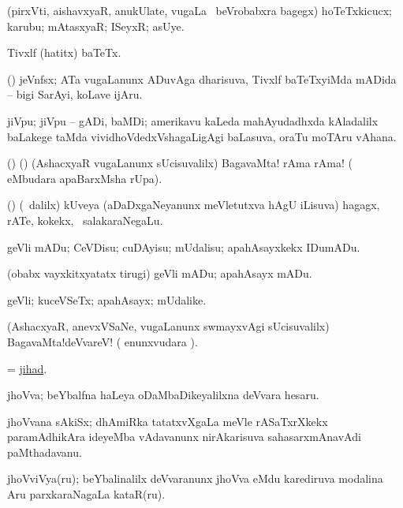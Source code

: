 \bentry
{}
\gl{\nA}
\bmng
(pirxVti, aishavxyaR, anukUlate, \mo vugaLa \vi\ beVrobabxra bagegx) hoTeTxkicucx; karubu; mAtasxyaR; ISeyxR; asUye. 
\emng
\eentry

\bentry
{}
\gl{\nA}
\bmng
Tivxlf (hatitx) baTeTx. 
\emng
\eentry

\bentry
{}
\gl{\nA}
\bmng
(\bava) jeVnfsx; ATa \mo vugaLanunx ADuvAga dharisuva, Tivxlf baTeTxyiMda mADida -- bigi SarAyi, koLave ijAru. 
\emng
\eentry

\bentry
{}
\gl{\nA}
\expl{\P}
\bmng
jiVpu; jiVpu -- gADi, baMDi; amerikavu kaLeda mahAyudadhxda kAladalilx baLakege taMda vividhoVdedxVshagaLigAgi baLasuva, oraTu moTAru vAhana. 
\emng
\eentry

\bentry
{}
\gl{\BAavayx}
\bmng
(\ame) (\ashi) (AshacxyaR \mo vugaLanunx sUcisuvalilx) BagavaMta! rAma rAma! ( eMbudara apaBarxMsha rUpa). 
\emng
\eentry

\bentry
{}
\gl{\nA}
\bmng
(\nw) (\sA\ \bava dalilx) kUveya (aDaDxgaNeyanunx meVletutxva hAgU iLisuva) hagagx, rATe, kokekx, \mo\ salakaraNegaLu. 
\emng
\eentry

\bentry
{}
\gl{\sakirx}
\bmng
geVli mADu; CeVDisu; cuDAyisu; mUdalisu; apahAsayxkekx IDumADu. 
\emng

\noindent
\gl{\akirx}
\bmng
(obabx vayxkitxyatatx tirugi) geVli mADu; apahAsayx mADu. 
\emng
\eentry

\bentry
{}
\gl{\nA}
\bmng
geVli; kuceVSeTx; apahAsayx; mUdalike. 
\emng
\eentry

\bentry
{}
\gl{\BAavayx}
\bmng
(AshacxyaR, anevxVSaNe, \mo vugaLanunx swmayxvAgi sUcisuvalilx) BagavaMta!deVvareV! ( enunxvudara \saMkiSx). 
\emng
\eentry

\bentry
{}
\gl{\nA}
\bmng
= \hyperlink{jihad}{jihad}. 
\emng
\eentry

\bentry
{}
\gl{\nA}
\bmng
j{ho}Vva; beYbalfna haLeya oDaMbaDikeyalilxna deVvara hesaru. 
\emng

\noindent
\gl{\pagu}
\bmng
{} j{ho}Vvana sAkiSx; dhAmiRka tatatxvXgaLa meVle rASaTxrXkekx paramAdhikAra ideyeMba vAdavanunx nirAkarisuva sahasarxmAnavAdi paMthadavanu. 
\emng
\eentry

\bentry
{}
\gl{\nA}
\bmng
j{ho}VviVya(ru); beYbalinalilx deVvaranunx j{ho}Vva eMdu karediruva modalina Aru parxkaraNagaLa kataR(ru). 
\emng
\eentry

